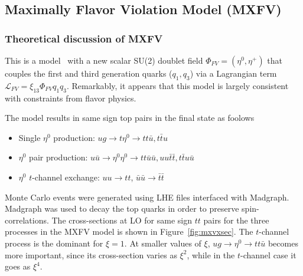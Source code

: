 



\subsection{Maximally Flavor Violation Model (MXFV)}
\label{sec:mxfv}

\subsubsection{Theoretical discussion of MXFV}
\label{sec:mxfvtheory}

This is a model~\cite{mxflv1,mxflv2,mxflv3} with a new scalar 
SU(2) doublet field $\Phi_{FV} = (\eta^0,\eta^+)$ that couples the first and third 
generation quarks ($q_1,q_3$) via a Lagrangian term 
$\mathcal{L}_{FV} = \xi_{13} \Phi_{FV} q_1 q_3$.  Remarkably, it appears that this
model is largely consistent with constraints from flavor physics.

The model results in same sign top pairs in the final state as foolows
\begin{itemize}

\item Single $\eta^0$ production: $ug \to t\eta^0 \to tt\bar{u}, t\bar{t}u$

\item $\eta^0$ pair production: $u \bar{u} \to \eta^0 \eta^0 \to tt\bar{u}\bar{u},
uu\bar{t}\bar{t}, t\bar{t}u\bar{u}$

\item $\eta^0$ $t$-channel exchange: $uu \to tt$, $\bar{u}\bar{u} \to \bar{t}\bar{t}$
\end{itemize}

Monte Carlo events were generated using LHE files\cite{simplifiedModel} interfaced 
with Madgraph.  Madgraph was used to decay the top quarks in order to preserve 
spin-correlations.  The cross-sections at LO for same sign $tt$ pairs for the three
processes in the MXFV model is shown in Figure~\ref{fig:mxvxsec}.  The $t$-channel
process is the dominant for $\xi = 1$.  At smaller values of $\xi$, 
$ug \to \eta^0 \to tt\bar{u}$ becomes more important, since its cross-section 
varies as $\xi^2$, while in the $t$-channel case it goes as $\xi^4$.

